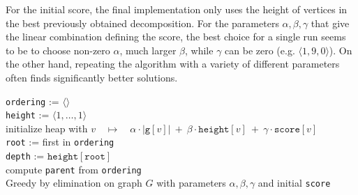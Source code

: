 \documentclass{timgad}
\begin{document}
For the initial score, the final implementation only uses the height of vertices in the best previously obtained decomposition.
For the parameters $\alpha,\beta,\gamma$ that give the linear combination defining the score,
the best choice for a single run seems to be to choose non-zero $\alpha$, much larger $\beta$, while $\gamma$ can be zero (e.g. $\langle1,9,0\rangle$).
On the other hand, repeating the algorithm with a variety of different parameters often finds significantly better solutions.

\begin{algorithm}[h]
 \texttt{ordering} := $\langle\rangle$\\
 \texttt{height} := $\langle 1,\dots,1\rangle$\\ 
 initialize heap with $v \quad \mapsto \quad \alpha \cdot |\texttt{g}[v]|\ +\ \beta \cdot \texttt{height}[v]\ +\ \gamma \cdot \texttt{score}[v]$\\
 \texttt{root} := first in \texttt{ordering}\\ 
 \texttt{depth} := $\texttt{height}[\texttt{root}]$\\
 compute \texttt{parent} from \texttt{ordering}\\ 
 \caption{Greedy by elimination on graph $G$ with parameters $\alpha,\beta,\gamma$ and initial \texttt{score}\hspace*{-2em}}
 \label{alg:elim}
\end{algorithm}

\pagebreak[4] 
\end{document}
